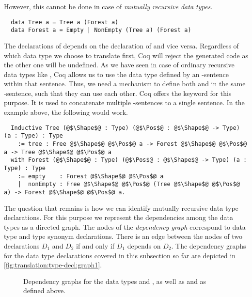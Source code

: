 However, this cannot be done in case of \textit{mutually recursive data types}.
\begin{verbatim}
  data Tree a = Tree a (Forest a)
  data Forest a = Empty | NonEmpty (Tree a) (Forest a)
\end{verbatim}
The declarations of  depends on the declaration of  and vice versa.
Regardless of which data type we choose to translate first, Coq will reject the generated code as the other one will be undefined.
As we have seen in case of ordinary recursive data types like , Coq allows us to use the data type defined by an -sentence within that sentence.
Thus, we need a mechanism to define both  and  in the same -sentence, such that they can use each other.
Coq offers the  keyword for this purpose.
It is used to concatenate multiple -sentences to a single sentence.
In the example above, the following would work.
\begin{verbatim}
  Inductive Tree (@$\Shape$@ : Type) (@$\Pos$@ : @$\Shape$@ -> Type) (a : Type) : Type
    := tree : Free @$\Shape$@ @$\Pos$@ a -> Forest @$\Shape$@ @$\Pos$@ a -> Tree @$\Shape$@ @$\Pos$@ a
  with Forest (@$\Shape$@ : Type) (@$\Pos$@ : @$\Shape$@ -> Type) (a : Type) : Type
    := empty    : Forest @$\Shape$@ @$\Pos$@ a
    |  nonEmpty : Free @$\Shape$@ @$\Pos$@ (Tree @$\Shape$@ @$\Pos$@ a) -> Forest @$\Shape$@ @$\Pos$@ a.
\end{verbatim}

The question that remains is how we can identify mutually recursive data type declarations.
For this purpose we represent the dependencies among the data types as a directed graph.
The nodes of the \textit{dependency graph} correspond to data type and type synonym declarations.
There is an edge between the nodes of two declarations $D_1$ and $D_2$ if and only if $D_1$ depends on $D_2$.
The dependency graphs for the data type declarations covered in this subsection so far are depicted in \autoref{fig:translation:type-decl:graph1}.

\begin{figure}[H]
  \caption{Dependency graphs for the data types  and ,  as well as  and  as defined above.}
  \label{fig:translation:type-decl:graph1}
\end{figure}

